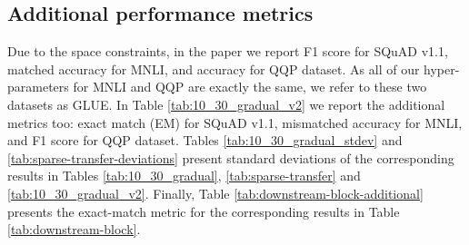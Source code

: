 \documentclass[11pt]{article}
\begin{document}
\subsection{Additional performance metrics}
Due to the space constraints, in the paper we report F1 score for SQuAD v1.1, matched accuracy for MNLI, and accuracy for QQP dataset. As all of our hyper-parameters for MNLI and QQP are exactly the same, we refer to these two datasets as GLUE. In Table \ref{tab:10_30_gradual_v2} we report the additional metrics too: exact match (EM) for SQuAD v1.1, mismatched accuracy for MNLI, and F1 score for QQP dataset. Tables \ref{tab:10_30_gradual_stdev} and \ref{tab:sparse-transfer-deviations} present standard deviations of the corresponding results in Tables \ref{tab:10_30_gradual}, \ref{tab:sparse-transfer} and \ref{tab:10_30_gradual_v2}. Finally, Table \ref{tab:downstream-block-additional} presents the exact-match metric for the corresponding results in Table \ref{tab:downstream-block}.
\end{document}
